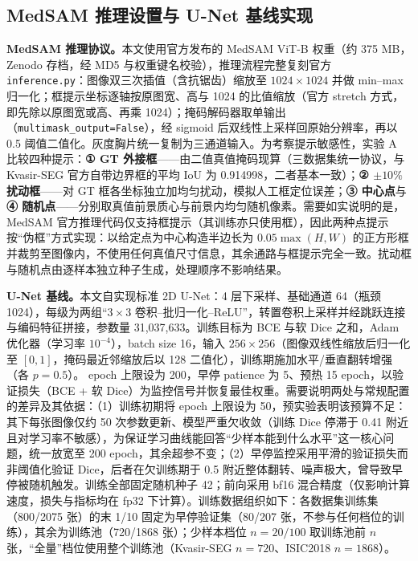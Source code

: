 \documentclass[zihao=-4,a4paper]{ctexart}
\begin{document}
\subsection{MedSAM 推理设置与 U-Net 基线实现}
\label{subsec:model}

\textbf{MedSAM 推理协议。}本文使用官方发布的 MedSAM ViT-B 权重（约 375 MB，Zenodo 存档，经 MD5 与权重键名校验），推理流程完整复刻官方 \texttt{inference.py}：图像双三次插值（含抗锯齿）缩放至 $1024\times1024$ 并做 min--max 归一化；框提示坐标逐轴按原图宽、高与 1024 的比值缩放（官方 stretch 方式，即先除以原图宽或高、再乘 1024）；掩码解码器取单输出（\texttt{multimask\_output=False}），经 sigmoid 后双线性上采样回原始分辨率，再以 0.5 阈值二值化。灰度胸片统一复制为三通道输入。为考察提示敏感性，实验 A 比较四种提示：\textbf{① GT 外接框}——由二值真值掩码现算（三数据集统一协议，与 Kvasir-SEG 官方自带边界框的平均 IoU 为 0.914998，二者基本一致）；\textbf{② $\pm10\%$ 扰动框}——对 GT 框各坐标独立加均匀扰动，模拟人工框定位误差；\textbf{③ 中心点}与\textbf{④ 随机点}——分别取真值前景质心与前景内均匀随机像素。需要如实说明的是，MedSAM 官方推理代码仅支持框提示（其训练亦只使用框），因此两种点提示按``伪框''方式实现：以给定点为中心构造半边长为 $0.05\max(H,W)$ 的正方形框并裁剪至图像内，不使用任何真值尺寸信息，其余通路与框提示完全一致。扰动框与随机点由逐样本独立种子生成，处理顺序不影响结果。

\textbf{U-Net 基线。}本文自实现标准 2D U-Net：4 层下采样、基础通道 64（瓶颈 1024），每级为两组``$3\times3$ 卷积--批归一化--ReLU''，转置卷积上采样并经跳跃连接与编码特征拼接，参数量 31{,}037{,}633。训练目标为 BCE 与软 Dice 之和，Adam 优化器（学习率 $10^{-4}$），batch size 16，输入 $256\times256$（图像双线性缩放后归一化至 $[0,1]$，掩码最近邻缩放后以 128 二值化），训练期施加水平/垂直翻转增强（各 $p=0.5$）。 epoch 上限设为 200，早停 patience 为 5、预热 15 epoch，以验证损失（BCE + 软 Dice）为监控信号并恢复最佳权重。需要说明两处与常规配置的差异及其依据：（1）训练初期将 epoch 上限设为 50，预实验表明该预算不足：其下每张图像仅约 50 次参数更新、模型严重欠收敛（训练 Dice 停滞于 0.41 附近且对学习率不敏感），为保证学习曲线能回答``少样本能到什么水平''这一核心问题，统一放宽至 200 epoch，其余超参不变；（2）早停监控采用平滑的验证损失而非阈值化验证 Dice，后者在欠训练期于 0.5 附近整体翻转、噪声极大，曾导致早停被随机触发。训练全部固定随机种子 42；前向采用 bf16 混合精度（仅影响计算速度，损失与指标均在 fp32 下计算）。训练数据组织如下：各数据集训练集（800/2075 张）的末 1/10 固定为早停验证集（80/207 张，不参与任何档位的训练），其余为训练池（720/1868 张）；少样本档位 $n=20/100$ 取训练池前 $n$ 张，``全量''档位使用整个训练池（Kvasir-SEG $n=720$、ISIC2018 $n=1868$）。
\end{document}
